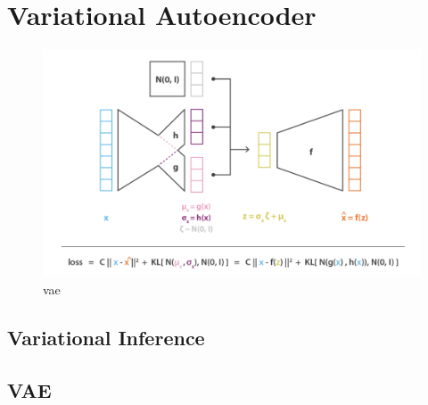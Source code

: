 \chapter{Variational Autoencoder}
\begin{figure}[H]
    \centering
    \includegraphics[width=12cm]{images/vae.png}
    \caption{vae}
    \label{fig:VAE}
\end{figure}

\section{Variational Inference}

\section{VAE}